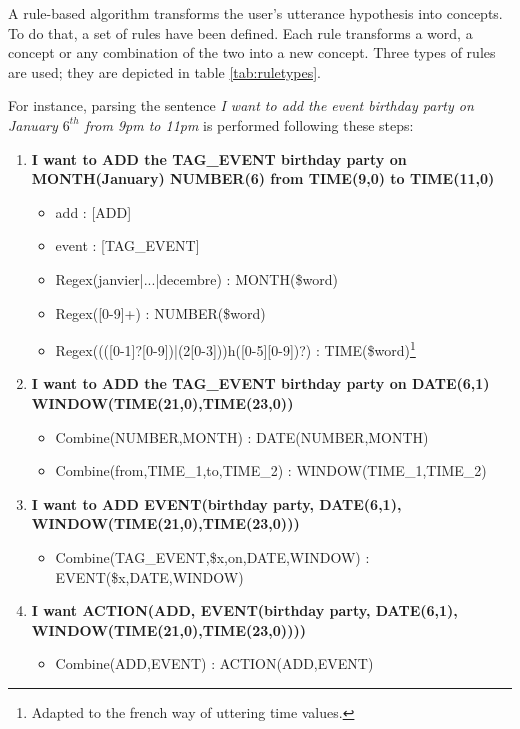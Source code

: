 			A rule-based algorithm transforms the user's utterance hypothesis into concepts. To do that, a set of rules have been defined. Each rule transforms a word, a concept or any combination of the two into a new concept. Three types of rules are used; they are depicted in table \ref{tab:ruletypes}.
			
			For instance, parsing the sentence \textit{I want to add the event birthday party on January $6^{th}$ from 9pm to 11pm} is performed following these steps:
							
							\begin{enumerate}
						\item \textbf{I want to ADD the TAG\_EVENT birthday party on MONTH(January) NUMBER(6) from TIME(9,0) to TIME(11,0)}
								\begin{itemize}
										\item add : [ADD]
											\item event : [TAG\_EVENT]
											\item Regex(janvier|...|decembre) : MONTH(\$word)
											\item Regex([0-9]+) : NUMBER(\$word)
											\item Regex((([0-1]?[0-9])|(2[0-3]))h([0-5][0-9])?) : TIME(\$word)\footnote{Adapted to the french way of uttering time values.}
									\end{itemize}
							\item \textbf{I want to ADD the TAG\_EVENT birthday party on DATE(6,1) \\ WINDOW(TIME(21,0),TIME(23,0))}
								\begin{itemize}
										\item Combine(NUMBER,MONTH) : DATE(NUMBER,MONTH)
											\item Combine(from,TIME\_1,to,TIME\_2) : WINDOW(TIME\_1,TIME\_2)
									\end{itemize}
							\item \textbf{I want to ADD EVENT(birthday party, DATE(6,1), \\ WINDOW(TIME(21,0),TIME(23,0)))}
								\begin{itemize}
										\item Combine(TAG\_EVENT,\$x,on,DATE,WINDOW) : EVENT(\$x,DATE,WINDOW)
									\end{itemize}
							\item \textbf{I want ACTION(ADD, EVENT(birthday party, DATE(6,1), \\ WINDOW(TIME(21,0),TIME(23,0))))}
								\begin{itemize}
										\item Combine(ADD,EVENT) : ACTION(ADD,EVENT)
									\end{itemize}
					\end{enumerate}
					
